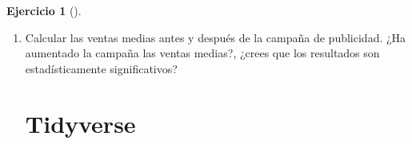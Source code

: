 \documentclass[
  a4paper,
]{scrreport}
\newenvironment{Shaded}{\begin{snugshade}}{\end{snugshade}}
\newcommand{\BuiltInTok}[1]{\textcolor[rgb]{0.00,0.23,0.31}{#1}}
\newcommand{\ErrorTok}[1]{\textcolor[rgb]{0.68,0.00,0.00}{#1}}
\newcommand{\ExtensionTok}[1]{\textcolor[rgb]{0.00,0.23,0.31}{#1}}
\newcommand{\KeywordTok}[1]{\textcolor[rgb]{0.00,0.23,0.31}{\textbf{#1}}}
\newcommand{\NormalTok}[1]{\textcolor[rgb]{0.00,0.23,0.31}{#1}}
\theoremstyle{definition}
\newtheorem{exercise}{Ejercicio}[chapter]
\theoremstyle{remark}
\begin{document}
\begin{exercise}[]
\begin{enumerate}
\begin{tcolorbox}
  \section{Copilot}

\begin{Shaded}
\begin{Highlighting}[]
\ExtensionTok{Crear}\NormalTok{ un data frame de nombre df con dos columnas: una columna de nombre antes que contenga los datos del número de unidades vendidas antes de una campaña de publicidad }\ErrorTok{(}\ExtensionTok{147,}\NormalTok{ 163, 121, 205, 132, 190, 176, 147}\KeywordTok{)}\ExtensionTok{,}\NormalTok{ y otra columna de nombre después que contenga los datos del número de unidades vendidas después de la campaña de publicidad }\ErrorTok{(}\ExtensionTok{150,}\NormalTok{ 171, 132, 208, 141, 184, 182, 145}\KeywordTok{)}\BuiltInTok{.}
\end{Highlighting}
\end{Shaded}

  \end{tcolorbox}
\item
  Calcular las ventas medias antes y después de la campaña de
  publicidad. ¿Ha aumentado la campaña las ventas medias?, ¿crees que
  los resultados son estadísticamente significativos?

  \begin{tcolorbox}[enhanced jigsaw, colframe=quarto-callout-tip-color-frame, toprule=.15mm, bottomtitle=1mm, breakable, opacitybacktitle=0.6, toptitle=1mm, colback=white, bottomrule=.15mm, title=\textcolor{quarto-callout-tip-color}{\faLightbulb}\hspace{0.5em}{Solución}, arc=.35mm, left=2mm, titlerule=0mm, rightrule=.15mm, coltitle=black, leftrule=.75mm, opacityback=0, colbacktitle=quarto-callout-tip-color!10!white]

  \section{Tidyverse}


\end{tcolorbox}
\end{enumerate}
\end{exercise}
\end{document}
